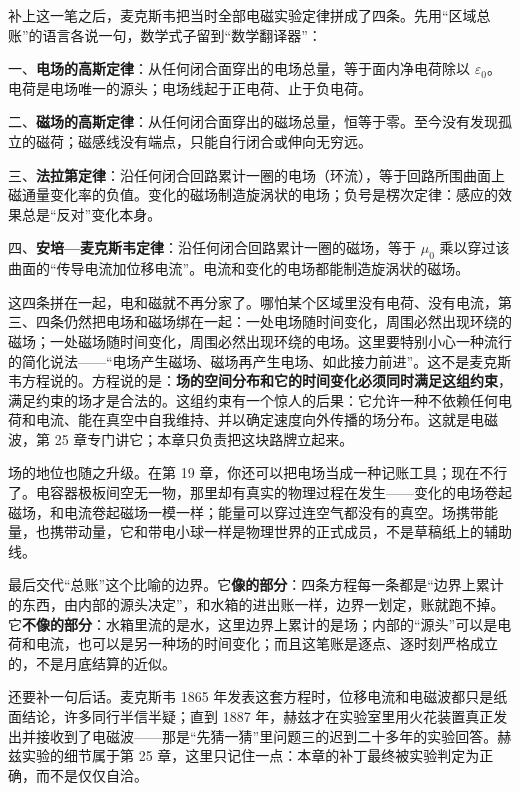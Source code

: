 补上这一笔之后，麦克斯韦把当时全部电磁实验定律拼成了四条。先用“区域总账”的语言各说一句，数学式子留到“数学翻译器”：

一、\textbf{电场的高斯定律}：从任何闭合面穿出的电场总量，等于面内净电荷除以 \(\varepsilon_0\)。电荷是电场唯一的源头；电场线起于正电荷、止于负电荷。

二、\textbf{磁场的高斯定律}：从任何闭合面穿出的磁场总量，恒等于零。至今没有发现孤立的磁荷；磁感线没有端点，只能自行闭合或伸向无穷远。

三、\textbf{法拉第定律}：沿任何闭合回路累计一圈的电场（环流），等于回路所围曲面上磁通量变化率的负值。变化的磁场制造旋涡状的电场；负号是楞次定律：感应的效果总是“反对”变化本身。

四、\textbf{安培—麦克斯韦定律}：沿任何闭合回路累计一圈的磁场，等于 \(\mu_0\) 乘以穿过该曲面的“传导电流加位移电流”。电流和变化的电场都能制造旋涡状的磁场。

这四条拼在一起，电和磁就不再分家了。哪怕某个区域里没有电荷、没有电流，第三、四条仍然把电场和磁场绑在一起：一处电场随时间变化，周围必然出现环绕的磁场；一处磁场随时间变化，周围必然出现环绕的电场。这里要特别小心一种流行的简化说法——“电场产生磁场、磁场再产生电场、如此接力前进”。这不是麦克斯韦方程说的。方程说的是：\textbf{场的空间分布和它的时间变化必须同时满足这组约束}，满足约束的场才是合法的。这组约束有一个惊人的后果：它允许一种不依赖任何电荷和电流、能在真空中自我维持、并以确定速度向外传播的场分布。这就是电磁波，第 25 章专门讲它；本章只负责把这块路牌立起来。

场的地位也随之升级。在第 19 章，你还可以把电场当成一种记账工具；现在不行了。电容器极板间空无一物，那里却有真实的物理过程在发生——变化的电场卷起磁场，和电流卷起磁场一模一样；能量可以穿过连空气都没有的真空。场携带能量，也携带动量，它和带电小球一样是物理世界的正式成员，不是草稿纸上的辅助线。

最后交代“总账”这个比喻的边界。它\textbf{像的部分}：四条方程每一条都是“边界上累计的东西，由内部的源头决定”，和水箱的进出账一样，边界一划定，账就跑不掉。它\textbf{不像的部分}：水箱里流的是水，这里边界上累计的是场；内部的“源头”可以是电荷和电流，也可以是另一种场的时间变化；而且这笔账是逐点、逐时刻严格成立的，不是月底结算的近似。

还要补一句后话。麦克斯韦 1865 年发表这套方程时，位移电流和电磁波都只是纸面结论，许多同行半信半疑；直到 1887 年，赫兹才在实验室里用火花装置真正发出并接收到了电磁波——那是“先猜一猜”里问题三的迟到二十多年的实验回答。赫兹实验的细节属于第 25 章，这里只记住一点：本章的补丁最终被实验判定为正确，而不是仅仅自洽。


